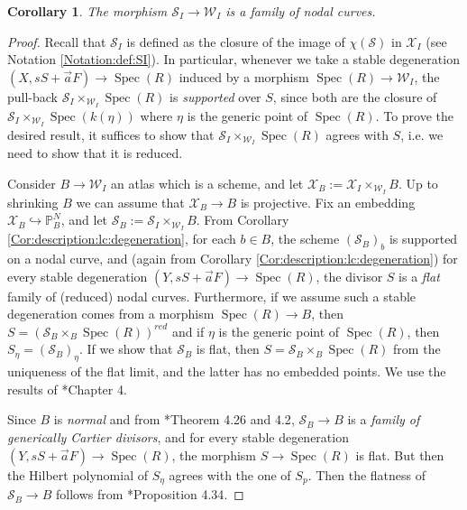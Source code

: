 \documentclass[11pt]{amsart}
\newcommand{\cE}{\mathcal{W}}
\newcommand{\sS}{\mathscr{S}}
\newcommand{\sX}{\mathscr{X}}
\newcommand{\spec}{\operatorname{Spec}}
\newtheorem{Cor}[theorem]{Corollary}
\theoremstyle{definition}
\begin{document}
\begin{Cor}\label{Cor:SI:is:a:fam:of:nodal:curves}The morphism $\sS_I \to \cE_I$ is a family of nodal curves.
\end{Cor}
\begin{proof}Recall that $\sS_I$ is defined as the closure of the image of $\chi(\sS)$ in $\sX_I$ (see Notation \ref{Notation:def:SI}). In particular, whenever we take a stable degeneration $(X,sS+\vec{a}F) \to \spec(R)$ induced by a morphism $\spec(R) \to \cE_I$, the pull-back $\sS_I \times_{\cE_I} \spec(R)$ is \emph{supported} over $S$, since both are the closure of $\sS_I \times_{\cE_I} \spec(k(\eta))$ where $\eta$ is the generic point of $\spec(R)$. To prove the desired result, it suffices to show that
$\sS_I \times_{\cE_I} \spec(R)$ agrees with $S$, i.e. we need to show that it is reduced. 

Consider
$B \to \cE_I$ an atlas which is a scheme, and let $\sX_B:= \sX_I \times_{\cE_I} B$. 
Up to shrinking $B$ we can assume that $\sX_B \to B$ is projective. Fix an embedding
$\sX_B \hookrightarrow \mathbb{P}^N_B$, and let $\sS_B:=\sS_I \times_{\cE_I}B$.
From Corollary \ref{Cor:description:lc:degeneration}, for each $b \in B$, the scheme $(\sS_B)_b$ is supported on a nodal curve, and (again from Corollary \ref{Cor:description:lc:degeneration}) for every stable degeneration $(Y,sS+\vec{a}F) \to \spec(R)$, the divisor $S$ is a \emph{flat} family of (reduced) nodal curves. Furthermore, if we assume such a stable degeneration comes from a morphism $\spec(R) \to B$, then $S=(\sS_B \times_B \spec(R))^{red}$ and if $\eta$ is the generic point of $\spec(R)$, then $S_\eta=(\sS_B)_\eta$. If we show that $\sS_B$ is flat, then $S=\sS_B \times_B \spec(R)$ from the uniqueness of the flat limit, and the latter has no embedded points. We use the results of \cite{kollarbook}*{Chapter 4}.

Since $B$ is \emph{normal} and from \cite{kollarbook}*{Theorem 4.26 and 4.2}, $\sS_B \to B$ is a \emph{family of generically Cartier divisors}, and for every stable degeneration $(Y,sS+\vec{a}F) \to \spec(R)$, the morphism $S \to \spec(R)$ is flat. But then the Hilbert polynomial of $S_\eta$ agrees with the one of $S_p$.
Then the flatness of $\sS_B \to B$ follows from \cite{kollarbook}*{Proposition 4.34}.
\end{proof}
\end{document}
